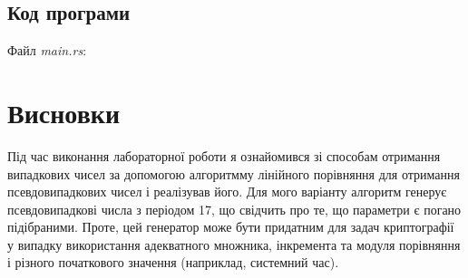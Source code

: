 \documentclass[oneside,14pt]{extarticle}
\begin{document}
\begin{normalsize}
	\subsection*{Код програми}
	Файл \textit{main.rs}:
	{\small	}
	
	\section*{Висновки}
	Під час виконання лабораторної роботи я ознайомився зі способам отримання випадкових чисел за допомогою алгоритмму лінійного порівняння для отримання псевдовипадкових чисел і реалізував його. Для мого варіанту алгоритм генерує псевдовипадкові числа з періодом 17, що свідчить про те, що параметри є погано підібраними. Проте, цей генератор може бути придатним для задач криптографії у випадку використання адекватного множника, інкремента та модуля порівняння і різного початкового значення (наприклад, системний час).
	    
\end{normalsize}
\end{document}
